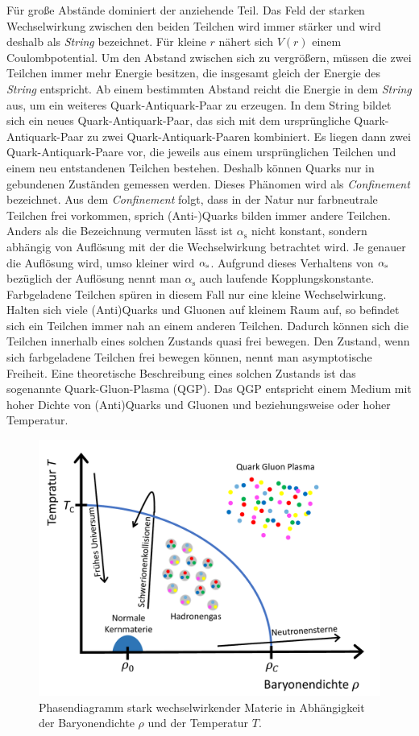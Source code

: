 F\"ur gro{\ss}e Abst\"ande dominiert der anziehende Teil.
Das Feld der starken Wechselwirkung zwischen den beiden Teilchen wird immer st\"arker und wird deshalb als \textit{String} bezeichnet.
F\"ur kleine $r$ n\"ahert sich $V(r)$ einem Coulombpotential.
\newline
Um den Abstand zwischen sich zu vergr\"o{\ss}ern, m\"ussen die zwei Teilchen immer mehr Energie besitzen, die insgesamt gleich der Energie des \textit{String} entspricht.
Ab einem bestimmten Abstand reicht die Energie in dem \textit{String} aus, um ein weiteres Quark-Antiquark-Paar zu erzeugen.
In dem String bildet sich ein neues Quark-Antiquark-Paar, das sich mit dem urspr\"ungliche Quark-Antiquark-Paar zu zwei Quark-Antiquark-Paaren kombiniert.
Es liegen dann zwei Quark-Antiquark-Paare vor, die jeweils aus einem urspr\"unglichen Teilchen und einem neu entstandenen Teilchen bestehen.
Deshalb k\"onnen Quarks nur in gebundenen Zust\"anden gemessen werden.
Dieses Ph\"anomen wird als \textit{Confinement} bezeichnet.
Aus dem \textit{Confinement} folgt, dass in der Natur nur farbneutrale Teilchen frei vorkommen, sprich (Anti-)Quarks bilden immer andere Teilchen.%
\newline
Anders als die Bezeichnung vermuten l\"asst ist $\alpha_\text{s}$ nicht konstant, sondern abh\"angig von Aufl\"osung mit der die Wechselwirkung betrachtet wird.
Je genauer die Aufl\"osung wird, umso kleiner wird $\alpha_{\rm{s}}$.
Aufgrund dieses Verhaltens von $\alpha_{\rm{s}}$ bez\"uglich der Aufl\"osung nennt man $\alpha_\text{s}$ auch laufende Kopplungskonstante.
Farbgeladene Teilchen sp\"uren in diesem Fall nur eine kleine Wechselwirkung.
Halten sich viele (Anti)Quarks und Gluonen auf kleinem Raum auf, so befindet sich ein Teilchen immer nah an einem anderen Teilchen.
Dadurch k\"onnen sich die Teilchen innerhalb eines solchen Zustands quasi frei bewegen.
Den Zustand, wenn sich farbgeladene Teilchen frei bewegen k\"onnen, nennt man asymptotische Freiheit.
\newline
Eine theoretische Beschreibung eines solchen Zustands ist das sogenannte Quark-Gluon-Plasma (QGP).
Das QGP entspricht einem Medium mit hoher Dichte von (Anti)Quarks und Gluonen und beziehungsweise oder hoher Temperatur.
\begin{figure}[tp]
\centering
\includegraphics[width=.6\linewidth]{QCD_phase_diagram.pdf}
\caption{Phasendiagramm stark wechselwirkender Materie in Abh\"angigkeit der Baryonendichte $\rho$ und der Temperatur $T$.
\cite{Thesis:Tim}}
\label{fig:QGPPhase}
\end{figure}
